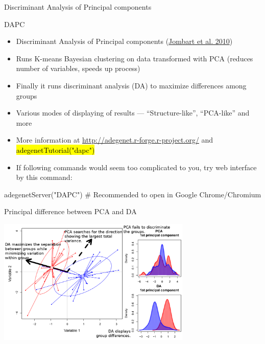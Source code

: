 \documentclass[compress, ucs, xelatex, 11pt, xcolor=svgnames,
  hyperref={
    bookmarks=true,
    unicode=true,
    colorlinks=true,
    pdftitle={Molecular data in R},
    plainpages=false,
    pdfauthor={Vojtech Zeisek},
    pdfsubject={Course about phylogeny and evolution in R},
    pdfcreator={XeLaTeX},
    pdfkeywords={R, evolution, phylogeny, molecular data},
    linkcolor=Tomato,
    anchorcolor=SaddleBrown,
    citecolor=Goldenrod,
    filecolor=DarkMagenta,
    menucolor=Sienna,
    urlcolor=DarkTurquoise,
    pdftex},
  url={hyphens, lowtilde} %
  ]{beamer}
\renewcommand{\texttt}[1]{\hl{\ttfamily #1}}
\begin{document}
\begin{frame}{Discriminant Analysis of Principal components}
  \tableofcontents[currentsection, sectionstyle=show/hide, hideothersubsections]
\end{frame}

\begin{frame}[fragile]{DAPC}
  \label{DAPC}
  \begin{itemize}
    \item Discriminant Analysis of Principal components (\href{https://bmcgenet.biomedcentral.com/articles/10.1186/1471-2156-11-94}{Jombart et al. 2010})
    \item Runs K-means Bayesian clustering on data transformed with PCA (reduces number of variables, speeds up process)
    \item Finally it runs discriminant analysis (DA) to maximize differences among groups
    \item Various modes of displaying of results --- ``Structure-like'', ``PCA-like'' and more
    \item More information at \url{http://adegenet.r-forge.r-project.org/} and \texttt{adegenetTutorial("dapc")}
    \item If following commands would seem too complicated to you, try web interface by this command:
  \end{itemize}
  \begin{spluscode}
    adegenetServer("DAPC") # Recommended to open in Google Chrome/Chromium
  \end{spluscode}
\end{frame}

\begin{frame}{Principal difference between PCA and DA}
  \begin{center}
    \includegraphics[height=6cm]{dapc-da-pca.png}
  \end{center}
\end{frame}
\end{document}
